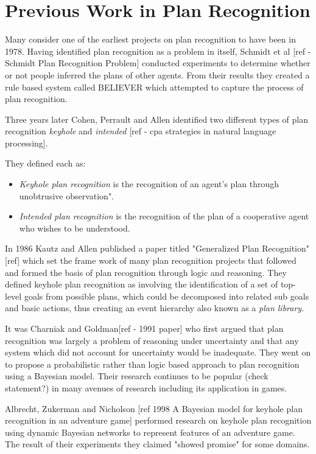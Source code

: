 \documentclass[parskip]{cs4rep}
\begin{document}
\section{Previous Work in Plan Recognition}

Many consider one of the earliest projects on plan recognition to have been in 1978. Having identified plan recognition as a problem in itself, Schmidt et al [ref - Schmidt Plan Recognition Problem] conducted experiments to determine whether or not people inferred the plans of other agents. From their results they created a rule based system called BELIEVER which attempted to capture the process of plan recognition. 

Three years later Cohen, Perrault and Allen identified two different types of plan recognition \textit{keyhole} and \textit{intended} [ref - cpa strategies in natural language processing]. 

They defined each as:

\begin{itemize}
\item
\textit{Keyhole plan recognition} is the recognition of an agent's plan through unobtrusive observation".
\item
\textit{Intended plan recognition} is the recognition of the plan of a cooperative agent who wishes to be understood.
\newline
\end{itemize}

In 1986 Kautz and Allen published a paper titled "Generalized Plan Recognition"[ref] which set the frame work of many plan recognition projects that followed and formed the basis of plan recognition through logic and reasoning. They defined keyhole plan recognition as involving the identification of a set of top-level goals from possible plans, which could be decomposed into related sub goals and basic actions, thus creating an event hierarchy also known as a \textit{plan library}. 

It was Charniak and Goldman[ref - 1991 paper] who first argued that plan recognition was largely a problem of reasoning under uncertainty and that any system which did not account for uncertainty would be inadequate. They went on to propose a probabilistic rather than logic based approach to  plan recognition using a Bayesian model. Their research continues to be popular (check statement?) in many avenues of research including its application in games.

Albrecht, Zukerman and Nicholson [ref 1998 A Bayesian model for keyhole plan recognition in an adventure game] performed research on keyhole plan recognition using dynamic Bayesian networks to represent features of an adventure game. The result of their experiments they claimed "showed promise" for some domains. 
\end{document}
